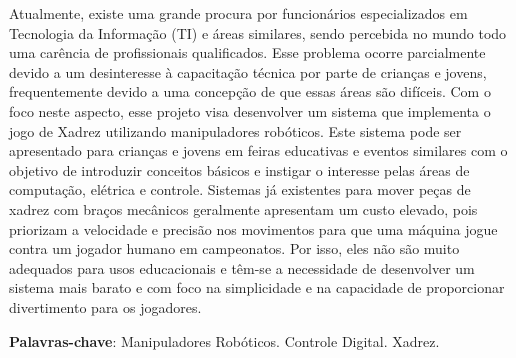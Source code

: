 \setlength{\absparsep}{18pt} %
\begin{resumo}
  Atualmente, existe uma grande procura por funcionários especializados em Tecnologia da Informação (TI) e áreas similares, sendo percebida no mundo todo uma carência de profissionais qualificados.
  Esse problema ocorre parcialmente devido a um desinteresse à capacitação técnica por parte de crianças e jovens, frequentemente devido a uma concepção de que essas áreas são difíceis.
  Com o foco neste aspecto, esse projeto visa desenvolver um sistema que implementa o jogo de Xadrez utilizando manipuladores robóticos.
  Este sistema pode ser apresentado para crianças e jovens em feiras educativas e eventos similares com o objetivo de introduzir conceitos básicos e instigar o interesse pelas áreas de computação, elétrica e controle.
  Sistemas já existentes para mover peças de xadrez com braços mecânicos geralmente apresentam um custo elevado, pois priorizam a velocidade e precisão nos movimentos para que uma máquina jogue contra um jogador humano em campeonatos.
  Por isso, eles não são muito adequados para usos educacionais e têm-se a necessidade de desenvolver um sistema mais barato e com foco na simplicidade e na capacidade de proporcionar divertimento para os jogadores.
 
  \vspace{\onelineskip} 
  \noindent 
  \textbf{Palavras-chave}: Manipuladores Robóticos. Controle Digital. Xadrez.



\end{resumo}

